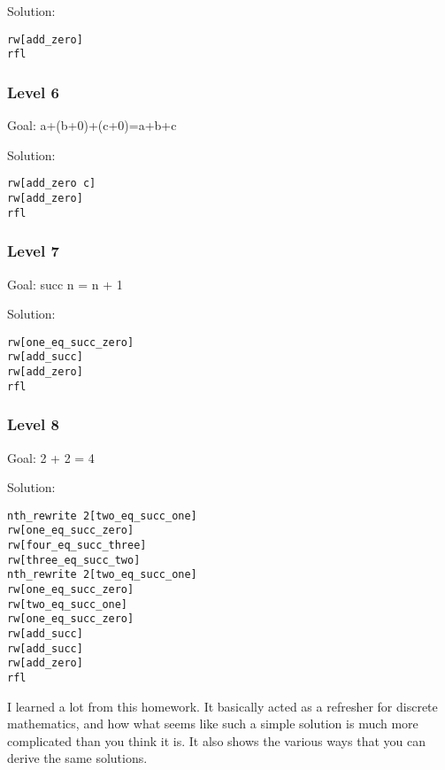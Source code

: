 \documentclass{article}
\theoremstyle{theorem}
\theoremstyle{definition}
\theoremstyle{remark}
\begin{document}
Solution:
\begin{lstlisting}
rw[add_zero]
rfl
\end{lstlisting}
\subsubsection*{Level 6}
Goal: a+(b+0)+(c+0)=a+b+c

Solution:
\begin{lstlisting}
rw[add_zero c]
rw[add_zero]
rfl
\end{lstlisting}
\subsubsection*{Level 7}
Goal: succ n = n + 1

Solution:
\begin{lstlisting}
rw[one_eq_succ_zero]
rw[add_succ]
rw[add_zero]
rfl
\end{lstlisting}
\subsubsection*{Level 8}
Goal: 2 + 2 = 4

Solution:
\begin{lstlisting}
nth_rewrite 2[two_eq_succ_one]
rw[one_eq_succ_zero]
rw[four_eq_succ_three]
rw[three_eq_succ_two]
nth_rewrite 2[two_eq_succ_one]
rw[one_eq_succ_zero]
rw[two_eq_succ_one]
rw[one_eq_succ_zero]
rw[add_succ]
rw[add_succ]
rw[add_zero]
rfl
\end{lstlisting}

I learned a lot from this homework. It basically acted as a refresher for discrete mathematics, and 
how what seems like such a simple solution is much more complicated than you think it is. It also shows 
the various ways that you can derive the same solutions.


%
%
\end{document}
